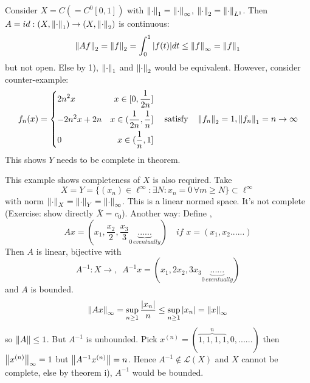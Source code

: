 \begin{example}[Completeness of $Y$]\nl
Consider $X=C(=C^0[0,1])$ with $\left\|{\cdot}\right\|_1=\left\|{\cdot}\right\|_\infty$, $\left\|{\cdot}\right\|_2=\left\|{\cdot}\right\|_{L^1}$. Then $A=id:(X,\left\|{\cdot}\right\|_1)\to(X,\left\|{\cdot}\right\|_2)$ is continuous:
$$
\left\|{Af}\right\|_2
=\left\|{f}\right\|_2
=\int_0^1|f(t)|dt
\leq\left\|{f}\right\|_\infty
=\left\|{f}\right\|_1
$$
but not open. Else by 1),  $\left\|{\cdot}\right\|_1$ and $\left\|{\cdot}\right\|_2$ would be equivalent. However, consider counter-example:
\begin{equation}\nonumber
f_n(x)=\left\{
\begin{split}
    &{2n^2x} &x\in[0,\frac{1}{2n}]\\
    &{-2n^2x+2n} &x\in(\frac{1}{2n},\frac{1}{n}]\\
    &0 &x\in(\frac{1}{n},1]\\
\end{split}
\right.\quad\text{satisfy}\quad\left\|{f_n}\right\|_2=1,\left\|{f_n}\right\|_1=n\to\infty
\end{equation}
This shows $Y$ needs to be complete in theorem.
\end{example}
\begin{example}[Completeness of $X$]\nl
This example shows completeness of $X$ is also required.
Take 
$$
X=Y=\{(x_n)\in\ell^\infty:\exists N:x_n=0\,\forall m\geq N\}\subset\ell^\infty
$$
with norm $\left\|{\cdot}\right\|_X=\left\|{\cdot}\right\|_Y=\left\|{\cdot}\right\|_\infty$. This is a linear normed space. It's not complete (Exercise: show directly $\overline{X}=c_0$). Another way:
Define , 
$$
Ax=(x_1,\frac{x_2}{2},\frac{x_3}{3}\underbrace{......}_{0\,eventually})\quad if \,\,x=(x_1,x_2......)
$$
Then $A$ is linear, bijective with 
$$
A^{-1}:X\to ,\,\,\,A^{-1}x=(x_1,2x_2,3x_3\underbrace{......}_{0\,eventually})
$$
and $A$ is bounded. 
$$
\left\|{Ax}\right\|_\infty=\sup_{n\geq1}\frac{|x_n|}{n}\leq\sup_{n\geq1}|x_n|=\left\|{x}\right\|_\infty
$$
so $\left\|{A}\right\|\leq1$. But $A^{-1}$ is unbounded. 
Pick $x^{(n)}=(\overbrace{1,1,1,1}^{n},0,......)$ then $\left\|{x^{(n)}}\right\|_\infty=1$ but $\left\|{A^{-1}x^{(n)}}\right\|=n$. Hence $A^{-1}\not\in\mathcal{L}(X)$ and $X$ cannot be complete, else by theorem i), $A^{-1}$ would be bounded.
\end{example}

